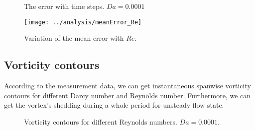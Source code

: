 \begin{figure}[!h]
	\centering
	\begin{minipage}{\textwidth}
		\centering
	\end{minipage}
	\centering
	\begin{minipage}{\textwidth}
		\centering
	\end{minipage}
	\caption{The error with time steps. $Da=0.0001$}
	\label{fig: resd}
\end{figure}

\begin{figure}[]
	\centering
	\texttt{[image: ../analysis/meanError\_Re]}
	\caption{Variation of the mean error with $Re$.}
	\label{fig: error}
\end{figure}

\subsection{Vorticity contours}
According to the measurement data, we can get instantaneous spanwise vorticity contours for different Darcy number and Reynolds number. Furthermore, we can get the vortex's shedding during a whole period for unsteady flow state.

\begin{figure}[]
	\centering
	\begin{minipage}{\textwidth}
		\centering
	\end{minipage}
	\centering
	\begin{minipage}{\textwidth}
		\centering
	\end{minipage}
	\centering
	\begin{minipage}{\textwidth}
		\centering
	\end{minipage}
	\caption{Vorticity contours for different Reynolds numbers.
		$Da=0.0001$.}
\end{figure}


